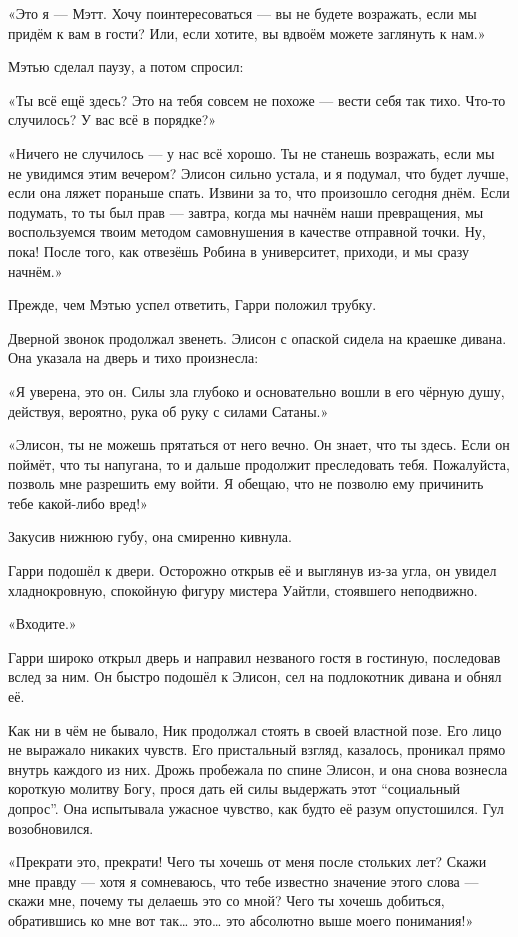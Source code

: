 \documentclass[a5paper, 9pt,
final, openany, twoside=true]{memoir}
\begin{document}
«Это я — Мэтт. Хочу поинтересоваться — вы не будете возражать, если мы придём к вам в гости? Или, если хотите, вы вдвоём можете заглянуть к нам.»

Мэтью сделал паузу, а потом спросил:

«Ты всё ещё здесь? Это на тебя совсем не похоже — вести себя так тихо. Что-то случилось? У вас всё в порядке?»

«Ничего не случилось — у нас всё хорошо. Ты не станешь возражать, если мы не увидимся этим вечером? Элисон сильно устала, и я подумал, что будет лучше, если она ляжет пораньше спать. Извини за то, что произошло сегодня днём. Если подумать, то ты был прав — завтра, когда мы начнём наши превращения, мы воспользуемся твоим методом самовнушения в качестве отправной точки. Ну, пока! После того, как отвезёшь Робина в университет, приходи, и мы сразу начнём.»

Прежде, чем Мэтью успел ответить, Гарри положил трубку.

Дверной звонок продолжал звенеть. Элисон с опаской сидела на краешке дивана. Она указала на дверь и тихо произнесла:

«Я уверена, это он. Силы зла глубоко и основательно вошли в его чёрную душу, действуя, вероятно, рука об руку с силами Сатаны.»

«Элисон, ты не можешь прятаться от него вечно. Он знает, что ты здесь. Если он поймёт, что ты напугана, то и дальше продолжит преследовать тебя. Пожалуйста, позволь мне разрешить ему войти. Я обещаю, что не позволю ему причинить тебе какой-либо вред!»

Закусив нижнюю губу, она смиренно кивнула.

Гарри подошёл к двери. Осторожно открыв её и выглянув из-за угла, он увидел хладнокровную, спокойную фигуру мистера Уайтли, стоявшего неподвижно.\bigskip

«Входите.»

Гарри широко открыл дверь и направил незваного гостя в гостиную, последовав вслед за ним. Он быстро подошёл к Элисон, сел на подлокотник дивана и обнял её.

Как ни в чём не бывало, Ник продолжал стоять в своей властной позе. Его лицо не выражало никаких чувств. Его пристальный взгляд, казалось, проникал прямо внутрь каждого из них. Дрожь пробежала по спине Элисон, и она снова вознесла короткую молитву Богу, прося дать ей силы выдержать этот ``социальный допрос''. Она испытывала ужасное чувство, как будто её разум опустошился. Гул возобновился.

«Прекрати это, прекрати! Чего ты хочешь от меня после стольких лет? Скажи мне правду — хотя я сомневаюсь, что тебе известно значение этого слова — скажи мне, почему ты делаешь это со мной? Чего ты хочешь добиться, обратившись ко мне вот так… это… это абсолютно выше моего понимания!»
\end{document}
